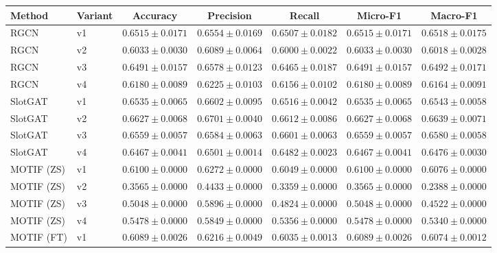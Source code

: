 \begin{table}[t]
\centering
\small
\begin{tabular}{||l||l||c|c|c||c|c||}
\hline
\textbf{Method} & \textbf{Variant} & \textbf{Accuracy} & \textbf{Precision} & \textbf{Recall} & \textbf{Micro-F1} & \textbf{Macro-F1} \\
\hline\hline
RGCN & v1 & $0.6515 \pm 0.0171$ & $0.6554 \pm 0.0169$ & $0.6507 \pm 0.0182$ & $0.6515 \pm 0.0171$ & $0.6518 \pm 0.0175$ \\
\hline
RGCN & v2 & $0.6033 \pm 0.0030$ & $0.6089 \pm 0.0064$ & $0.6000 \pm 0.0022$ & $0.6033 \pm 0.0030$ & $0.6018 \pm 0.0028$ \\
\hline
RGCN & v3 & $0.6491 \pm 0.0157$ & $0.6578 \pm 0.0123$ & $0.6465 \pm 0.0187$ & $0.6491 \pm 0.0157$ & $0.6492 \pm 0.0171$ \\
\hline
RGCN & v4 & $0.6180 \pm 0.0089$ & $0.6225 \pm 0.0103$ & $0.6156 \pm 0.0102$ & $0.6180 \pm 0.0089$ & $0.6164 \pm 0.0091$ \\
\hline
\hline
SlotGAT & v1 & $0.6535 \pm 0.0065$ & $0.6602 \pm 0.0095$ & $0.6516 \pm 0.0042$ & $0.6535 \pm 0.0065$ & $0.6543 \pm 0.0058$ \\
\hline
SlotGAT & v2 & $0.6627 \pm 0.0068$ & $0.6701 \pm 0.0040$ & $0.6612 \pm 0.0086$ & $0.6627 \pm 0.0068$ & $0.6639 \pm 0.0071$ \\
\hline
SlotGAT & v3 & $0.6559 \pm 0.0057$ & $0.6584 \pm 0.0063$ & $0.6601 \pm 0.0063$ & $0.6559 \pm 0.0057$ & $0.6580 \pm 0.0058$ \\
\hline
SlotGAT & v4 & $0.6467 \pm 0.0041$ & $0.6501 \pm 0.0014$ & $0.6482 \pm 0.0023$ & $0.6467 \pm 0.0041$ & $0.6476 \pm 0.0030$ \\
\hline
\hline
MOTIF (ZS) & v1 & $0.6100 \pm 0.0000$ & $0.6272 \pm 0.0000$ & $0.6049 \pm 0.0000$ & $0.6100 \pm 0.0000$ & $0.6076 \pm 0.0000$ \\
\hline
MOTIF (ZS) & v2 & $0.3565 \pm 0.0000$ & $0.4433 \pm 0.0000$ & $0.3359 \pm 0.0000$ & $0.3565 \pm 0.0000$ & $0.2388 \pm 0.0000$ \\
\hline
MOTIF (ZS) & v3 & $0.5048 \pm 0.0000$ & $0.5896 \pm 0.0000$ & $0.4824 \pm 0.0000$ & $0.5048 \pm 0.0000$ & $0.4522 \pm 0.0000$ \\
\hline
MOTIF (ZS) & v4 & $0.5478 \pm 0.0000$ & $0.5849 \pm 0.0000$ & $0.5356 \pm 0.0000$ & $0.5478 \pm 0.0000$ & $0.5340 \pm 0.0000$ \\
\hline
\hline
MOTIF (FT) & v1 & $0.6089 \pm 0.0026$ & $0.6216 \pm 0.0049$ & $0.6035 \pm 0.0013$ & $0.6089 \pm 0.0026$ & $0.6074 \pm 0.0012$ \\

\end{tabular}
\end{table}
